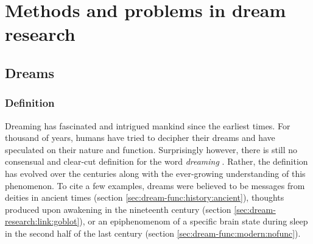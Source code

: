 \cleardoublepage

\chapter{Methods and problems in dream research}
\label{sec:dream-research}


\section{Dreams}
\label{sec:dream-research:dreams}

\subsection{Definition}
\label{sec:dream-research:dreams:definition}

Dreaming has fascinated and intrigued mankind since the earliest times. For thousand of years, humans have tried to decipher their dreams and have speculated on their nature and function. Surprisingly however, there is still no consensual and clear-cut definition for the word \emph{dreaming} \citep{pagel_definitions_2001}. Rather, the definition has evolved over the centuries along with the ever-growing understanding of this phenomenon. To cite a few examples, dreams were believed to be messages from deities in ancient times (section \ref{sec:dream-func:history:ancient}), thoughts produced upon awakening in the nineteenth century (section \ref{sec:dream-research:link:goblot}), or an epiphenomenom of a specific brain state during sleep in the second half of the last century (section \ref{sec:dream-func:modern:nofunc}).

